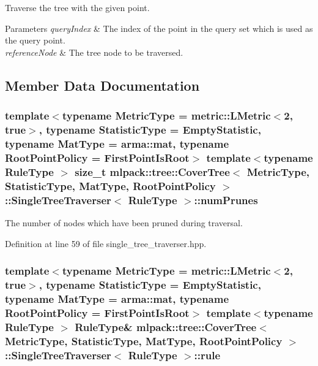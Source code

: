 Traverse the tree with the given point. 


\begin{DoxyParams}{Parameters}
{\em query\+Index} & The index of the point in the query set which is used as the query point. \\
\hline
{\em reference\+Node} & The tree node to be traversed. \\
\hline
\end{DoxyParams}


\subsection{Member Data Documentation}
\subsubsection[{num\+Prunes}]{\setlength{\rightskip}{0pt plus 5cm}template$<$typename Metric\+Type  = metric\+::\+L\+Metric$<$2, true$>$, typename Statistic\+Type  = Empty\+Statistic, typename Mat\+Type  = arma\+::mat, typename Root\+Point\+Policy  = First\+Point\+Is\+Root$>$ template$<$typename Rule\+Type $>$ size\+\_\+t {\bf mlpack\+::tree\+::\+Cover\+Tree}$<$ Metric\+Type, Statistic\+Type, Mat\+Type, Root\+Point\+Policy $>$\+::{\bf Single\+Tree\+Traverser}$<$ Rule\+Type $>$\+::num\+Prunes\hspace{0.3cm}{\ttfamily [private]}}\label{classmlpack_1_1tree_1_1CoverTree_1_1SingleTreeTraverser_aa4f87d46481c9bd4a9a89aa9ceb3da9c}


The number of nodes which have been pruned during traversal. 



Definition at line 59 of file single\+\_\+tree\+\_\+traverser.\+hpp.

\subsubsection[{rule}]{\setlength{\rightskip}{0pt plus 5cm}template$<$typename Metric\+Type  = metric\+::\+L\+Metric$<$2, true$>$, typename Statistic\+Type  = Empty\+Statistic, typename Mat\+Type  = arma\+::mat, typename Root\+Point\+Policy  = First\+Point\+Is\+Root$>$ template$<$typename Rule\+Type $>$ Rule\+Type\& {\bf mlpack\+::tree\+::\+Cover\+Tree}$<$ Metric\+Type, Statistic\+Type, Mat\+Type, Root\+Point\+Policy $>$\+::{\bf Single\+Tree\+Traverser}$<$ Rule\+Type $>$\+::rule\hspace{0.3cm}{\ttfamily [private]}}\label{classmlpack_1_1tree_1_1CoverTree_1_1SingleTreeTraverser_aed42b8a62ef75b0a3d190ca29ff0737f}



